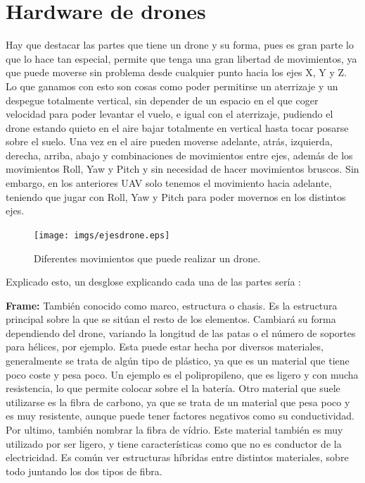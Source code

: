 \section{Hardware de drones}
\hspace{1 cm} Hay que destacar las partes que tiene un drone y su forma, pues es gran parte lo que lo hace tan especial, permite que tenga una gran libertad de movimientos, ya que puede moverse sin problema desde cualquier punto hacia los ejes X, Y y Z. Lo que ganamos con esto son cosas como poder permitirse un aterrizaje y un despegue totalmente vertical, sin depender de un espacio en el que coger velocidad para poder levantar el vuelo, e igual con el aterrizaje, pudiendo el drone estando quieto en el aire bajar totalmente en vertical hasta tocar posarse sobre el suelo. Una vez en el aire pueden moverse adelante, atr\'as, izquierda, derecha, arriba, abajo y combinaciones de movimientos entre ejes, adem\'as de los movimientos Roll, Yaw y Pitch y sin necesidad de hacer movimientos bruscos. Sin embargo, en los anteriores UAV solo tenemos el movimiento hacia adelante, teniendo que jugar con Roll, Yaw y Pitch para poder movernos en los distintos ejes.

\begin{figure}[ht]
	\centering
		\texttt{[image: imgs/ejesdrone.eps]}
		\caption{Diferentes movimientos que puede realizar un drone.}
	\label{fig:ejesdrone}
\end{figure}

\hspace{1 cm} Explicado esto, un desglose explicando cada una de las partes ser\'ia :

\hspace{1 cm}\textbf{Frame:} Tambi\'en conocido como marco, estructura o chasis. Es la estructura principal sobre la que se sit\'uan el resto de los elementos. Cambiar\'a su forma dependiendo del drone, variando la longitud de las patas o el n\'umero de soportes para h\'elices, por ejemplo. Esta puede estar hecha por diversos materiales, generalmente se trata de alg\'un tipo de pl\'astico, ya que es un material que tiene poco coste y pesa poco. Un ejemplo es el polipropileno, que es ligero y con mucha resistencia, lo que permite colocar sobre el la bater\'ia. Otro material que suele utilizarse es la fibra de carbono, ya que se trata de un material que pesa poco y es muy resistente, aunque puede tener factores negativos como su conductividad. Por ultimo, tambi\'en nombrar la fibra de v\'idrio. Este material tambi\'en es muy utilizado por ser ligero, y tiene caracter\'isticas como que no es conductor de la electricidad. Es com\'un ver estructuras h\'ibridas entre distintos materiales, sobre todo juntando los dos tipos de fibra. 

